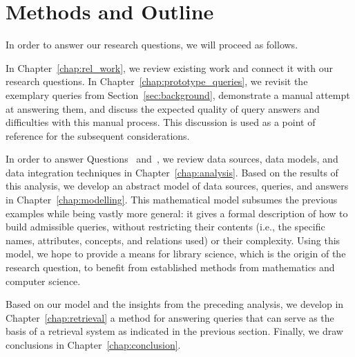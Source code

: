 \section{Methods and Outline}
\label{sec:methods}

In order to answer our research questions, we will proceed as follows.

In Chapter~\ref{chap:rel_work}, we review existing work 
and connect it with our research questions.
In Chapter~\ref{chap:prototype_queries}, we revisit
the exemplary queries from Section~\ref{sec:background},
demonstrate a manual attempt at answering them,
and discuss the expected quality of query answers and difficulties with this manual process.
This discussion is used as a point of reference for the subsequent considerations.

In order to answer Questions~ and~, we review
data sources, data models, and data integration techniques in Chapter~\ref{chap:analysis}.
Based on the results of this analysis, we develop an abstract model of
data sources, queries, and answers in Chapter~\ref{chap:modelling}.
This mathematical model subsumes the previous examples
while being vastly more general: it gives a formal description of how to
build admissible queries, without restricting their contents
(i.e., the specific names, attributes, concepts, and relations used)
or their complexity. Using this model, we hope to provide a means
for library science, which is the origin of the research question,
to benefit from established methods from mathematics and computer science.

Based on our model and the insights from the preceding analysis,
we develop in Chapter~\ref{chap:retrieval}
a method for answering queries that can serve as the basis of a retrieval system
as indicated in the previous section.
Finally, we draw conclusions in Chapter~\ref{chap:conclusion}.

